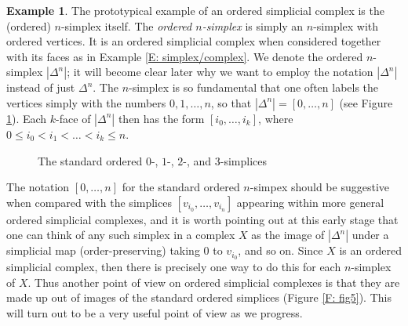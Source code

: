 \documentclass[12pt]{article}
\theoremstyle{plain}
\theoremstyle{definition}
\newtheorem{example}[theorem]{Example}
\begin{document}
\begin{example}\label{E: n-simplex}
The prototypical example of an ordered simplicial complex is the (ordered) $n$-simplex itself\footnotemark. The \emph{ordered $n$-simplex} is simply an $n$-simplex with ordered vertices. It is an ordered simplicial complex when considered together with its faces as in Example \ref{E: simplex/complex}. We denote the ordered $n$-simplex $|\Delta^n|$; it will become clear later why we want to employ the notation $|\Delta^n|$ instead of just $\Delta^n$.  
The $n$-simplex is so fundamental that one often labels the vertices simply with the numbers $0,1,\ldots, n$, so that $|\Delta^n|=[0,\ldots,n]$ (see Figure \ref{F: fig2}). Each $k$-face of $|\Delta^n|$ then has the form $[i_0,\ldots, i_k]$, where $0\leq i_0<i_1<\ldots <i_k\leq n$. 



\begin{figure}[!htp]
\begin{center}
\end{center}
\caption{The standard ordered $0$-, $1$-, $2$-, and $3$-simplices}\label{F: fig2}
\end{figure}
\end{example}

The notation $[0,\ldots,n]$ for the standard ordered $n$-simpex should be suggestive when compared with the simplices $[v_{i_0},\ldots, v_{i_n}]$ appearing within more general ordered simplicial complexes, and it is worth pointing out at this early stage that one can think of any such simplex in a complex $X$ as the image of $|\Delta^n|$ under a  simplicial map (order-preserving) taking $0$ to $v_{i_0}$, and so on. Since $X$ is an ordered simplicial complex, then there is precisely one way to do this for each $n$-simplex of $X$.
Thus another point of view on ordered simplicial complexes is that they are made up out of images of the  standard ordered simplices (Figure \ref{F: fig5}). This will turn out to be a very useful point of view as we progress. 
\end{document}
